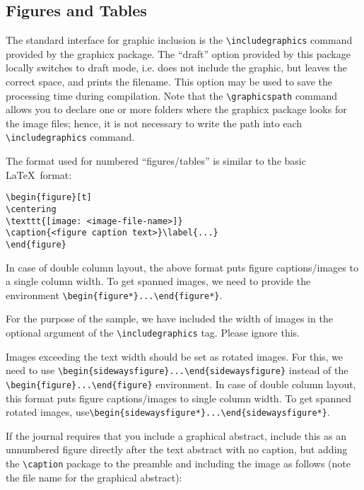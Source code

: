 \documentclass{article}
\begin{document}
\subsection{Figures and Tables}
The standard interface for graphic inclusion is the \verb+\includegraphics+ command provided by the graphicx  package. The ``draft'' option provided by this package locally switches to draft mode, i.e. does not include the graphic, but leaves the correct space, and prints the filename. This option may be used to save the processing time during compilation. Note that the \verb+\graphicspath+ command allows you to declare one or more folders where the graphicx package looks for the image files; hence, it is not necessary to write the path into each \verb+\includegraphics+ command.

The format used for numbered ``figures/tables'' is similar to the basic \LaTeX\ format:

\begin{verbatim}
\begin{figure}[t]
\centering
\texttt{[image: <image-file-name>]}
\caption{<figure caption text>}\label{...}
\end{figure}
\end{verbatim}

In case of double column layout, the above format puts figure captions/images to a single column width. To get spanned images, we need to provide the environment
\verb+\begin{figure*}...\end{figure*}+.

For the purpose of the sample, we have included the width of images in the optional argument of the \verb+\includegraphics+ tag. Please ignore this.

Images exceeding the text width should be set as rotated images. For this, we need to use \verb+\begin{sidewaysfigure}...\end{sidewaysfigure}+ instead of the \verb+\begin{figure}...\end{figure}+ environment. In case of double column layout, this format puts figure captions/images to single column width. To get spanned rotated images, use\newline \verb+\begin{sidewaysfigure*}...\end{sidewaysfigure*}+.

If the journal requires that you include a graphical abstract, include this as an unnumbered figure directly after the text abstract with no caption, but adding the \verb+\caption+ package to the preamble and including the image as follows (note the file name for the graphical abstract):
\end{document}
